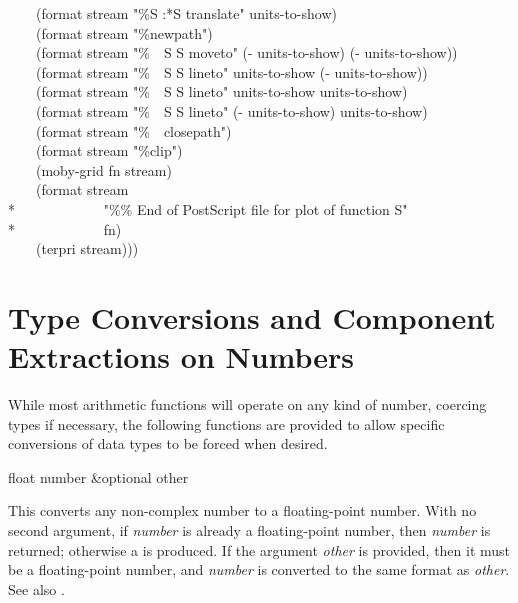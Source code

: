 \begin{new}
\begin{lisp}
~~~~(format stream "{\Xtilde}\%{\Xtilde}S {\Xtilde}:*{\Xtilde}S translate" units-to-show) \\
~~~~(format stream "{\Xtilde}\%newpath") \\
~~~~(format stream "{\Xtilde}\%~~{\Xtilde}S {\Xtilde}S moveto" (- units-to-show) (- units-to-show)) \\
~~~~(format stream "{\Xtilde}\%~~{\Xtilde}S {\Xtilde}S lineto" units-to-show (- units-to-show)) \\
~~~~(format stream "{\Xtilde}\%~~{\Xtilde}S {\Xtilde}S lineto" units-to-show units-to-show) \\
~~~~(format stream "{\Xtilde}\%~~{\Xtilde}S {\Xtilde}S lineto" (- units-to-show) units-to-show) \\
~~~~(format stream "{\Xtilde}\%~~closepath") \\
~~~~(format stream "{\Xtilde}\%clip") \\
~~~~(moby-grid fn stream) \\
~~~~(format stream \\*
~~~~~~~~~~~~"{\Xtilde}\%\% End of PostScript file for plot of function {\Xtilde}S" \\*
~~~~~~~~~~~~fn) \\
~~~~(terpri stream)))
\end{lisp}
\endgroup
\end{new}

\section{Type Conversions and Component Extractions on Numbers}

While most arithmetic functions will operate on any kind of number,
coercing types if necessary, the following functions are provided to
allow specific conversions of data types to be forced when desired.

\begin{defun}[Function]
float number &optional other

This converts any non-complex number to a floating-point number.
With no second argument, if \emph{number} is already a floating-point
number, then \emph{number} is returned;
otherwise a  is produced.
If the argument \emph{other} is provided, then it must be a floating-point
number, and \emph{number} is converted to the same format as \emph{other}.
See also .
\end{defun}

